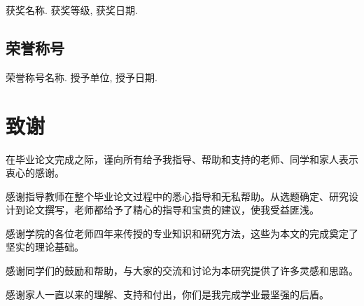 \documentclass[numbering=arabic,fontset=auto]{jnuthesis}
\begin{document}
\begin{enumerate}[label={[\arabic*]}]
  \item 获奖名称. 获奖等级, 获奖日期.
\end{enumerate}

\section{荣誉称号}

\begin{enumerate}[label={[\arabic*]}]
  \item 荣誉称号名称. 授予单位, 授予日期.
\end{enumerate}

\backmatter
\chapter{致谢}

在毕业论文完成之际，谨向所有给予我指导、帮助和支持的老师、同学和家人表示衷心的感谢。

感谢指导教师在整个毕业论文过程中的悉心指导和无私帮助。从选题确定、研究设计到论文撰写，老师都给予了精心的指导和宝贵的建议，使我受益匪浅。

感谢学院的各位老师四年来传授的专业知识和研究方法，这些为本文的完成奠定了坚实的理论基础。

感谢同学们的鼓励和帮助，与大家的交流和讨论为本研究提供了许多灵感和思路。

感谢家人一直以来的理解、支持和付出，你们是我完成学业最坚强的后盾。
\end{document}
